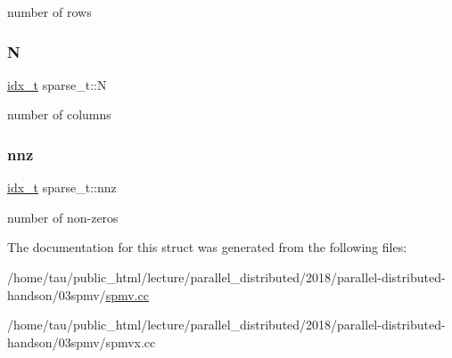 number of rows \mbox{\label{structsparse__t_a418c6deef17a60f31ff11182ea94f85a}} 
\subsubsection{\texorpdfstring{N}{N}}
{\footnotesize\ttfamily \hyperlink{spmv_8cc_a8e93478a00e685bea5e6a3f617bf03a3}{idx\+\_\+t} sparse\+\_\+t\+::N}

number of columns \mbox{\label{structsparse__t_ae982d138f3904323b65975769b045a3f}} 
\subsubsection{\texorpdfstring{nnz}{nnz}}
{\footnotesize\ttfamily \hyperlink{spmv_8cc_a8e93478a00e685bea5e6a3f617bf03a3}{idx\+\_\+t} sparse\+\_\+t\+::nnz}

number of non-\/zeros 

The documentation for this struct was generated from the following files\+:\begin{DoxyCompactItemize}
\item 
/home/tau/public\+\_\+html/lecture/parallel\+\_\+distributed/2018/parallel-\/distributed-\/handson/03spmv/\hyperlink{spmv_8cc}{spmv.\+cc}\item 
/home/tau/public\+\_\+html/lecture/parallel\+\_\+distributed/2018/parallel-\/distributed-\/handson/03spmv/spmvx.\+cc\end{DoxyCompactItemize}
